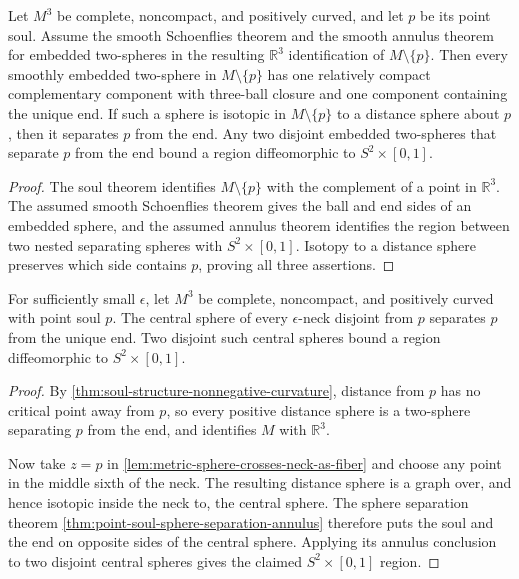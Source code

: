\begin{theorem}
\label{thm:point-soul-sphere-separation-annulus}
\notready
Let $M^3$ be complete, noncompact, and positively curved, and let $p$ be its
point soul.  Assume the smooth Schoenflies theorem and the smooth annulus
theorem for embedded two-spheres in the resulting $\mathbb R^3$ identification
of $M\setminus\{p\}$.  Then every smoothly embedded two-sphere in
$M\setminus\{p\}$ has one
relatively compact complementary component with three-ball closure and one
component containing the unique end.  If such a sphere is isotopic in
$M\setminus\{p\}$ to a distance sphere about $p$, then it separates $p$ from
the end.  Any two disjoint embedded two-spheres that separate $p$ from the
end bound a region diffeomorphic to $S^2\times[0,1]$.
\end{theorem}

\begin{proof}
The soul theorem identifies $M\setminus\{p\}$ with the complement of a point
in $\mathbb R^3$.  The assumed smooth Schoenflies theorem gives the ball and
end sides of an embedded sphere, and the assumed annulus theorem identifies
the region between two nested separating spheres with $S^2\times[0,1]$.
Isotopy to a distance sphere preserves which side contains $p$, proving all
three assertions.
\end{proof}

\begin{lemma}
\label{lem:positive-curvature-neck-separation}
\notready
For sufficiently small $\epsilon$, let $M^3$ be complete, noncompact, and
positively curved with point soul $p$.  The central sphere of every
$\epsilon$-neck disjoint from $p$ separates $p$ from the unique end.  Two
disjoint such central spheres bound a region diffeomorphic to
$S^2\times[0,1]$.
\end{lemma}

\begin{proof}
By \ref{thm:soul-structure-nonnegative-curvature}, distance from $p$ has no
critical point away from $p$, so every positive distance sphere is a
two-sphere separating $p$ from the end, and identifies $M$ with
$\mathbb R^3$.

Now take $z=p$ in
\ref{lem:metric-sphere-crosses-neck-as-fiber} and choose any point in the
middle sixth of the neck.  The resulting distance sphere is a graph over,
and hence isotopic inside the neck to, the central sphere.  The sphere
separation theorem \ref{thm:point-soul-sphere-separation-annulus} therefore
puts the soul and the end on opposite sides of the central sphere.  Applying
its annulus conclusion to two disjoint central spheres gives the claimed
$S^2\times[0,1]$ region.
\end{proof}

